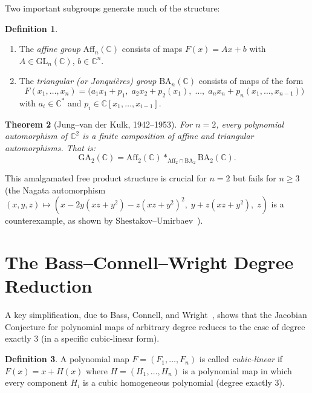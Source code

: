\documentclass[12pt,a4paper]{amsart}
\newtheorem{theorem}{Theorem}[section]
\theoremstyle{definition}
\newtheorem{definition}[theorem]{Definition}
\theoremstyle{remark}
\begin{document}
Two important subgroups generate much of the structure:

\begin{definition}
\begin{enumerate}[label=(\alph*)]
  \item The \emph{affine group} $\mathrm{Aff}_n(\mathbb{C})$ consists of maps
        $F(x) = Ax + b$ with $A \in \mathrm{GL}_n(\mathbb{C})$, $b \in \mathbb{C}^n$.
  \item The \emph{triangular (or Jonquières) group} $\mathrm{BA}_n(\mathbb{C})$
        consists of maps of the form
        \[
          F(x_1,\ldots,x_n) = \bigl(a_1 x_1 + p_1,\;
           a_2 x_2 + p_2(x_1),\;\ldots,\;
           a_n x_n + p_n(x_1,\ldots,x_{n-1})\bigr)
        \]
        with $a_i \in \mathbb{C}^*$ and $p_i \in \mathbb{C}[x_1,\ldots,x_{i-1}]$.
\end{enumerate}
\end{definition}

\begin{theorem}[Jung--van der Kulk, 1942--1953]\label{thm:jung}
For $n = 2$, every polynomial automorphism of $\mathbb{C}^2$ is a finite composition
of affine and triangular automorphisms. That is:
\[
  \mathrm{GA}_2(\mathbb{C}) = \mathrm{Aff}_2(\mathbb{C}) * _{\mathrm{Aff}_2 \cap \mathrm{BA}_2} \mathrm{BA}_2(\mathbb{C}).
\]
\end{theorem}

This amalgamated free product structure is crucial for $n=2$ but fails for $n \geq 3$
(the Nagata automorphism $(x,y,z) \mapsto (x - 2y(xz+y^2) - z(xz+y^2)^2,\; y+z(xz+y^2),\; z)$
is a counterexample, as shown by Shestakov--Umirbaev~\cite{ShU04}).

\section{The Bass--Connell--Wright Degree Reduction}
\label{sec:BCW}

A key simplification, due to Bass, Connell, and Wright~\cite{BCW82}, shows that
the Jacobian Conjecture for polynomial maps of arbitrary degree reduces to the
case of degree exactly $3$ (in a specific cubic-linear form).

\begin{definition}
A polynomial map $F = (F_1,\ldots,F_n)$ is called \emph{cubic-linear} if
$F(x) = x + H(x)$ where $H = (H_1,\ldots,H_n)$ is a polynomial map in which
every component $H_i$ is a cubic homogeneous polynomial (degree exactly $3$).
\end{definition}
\end{document}
